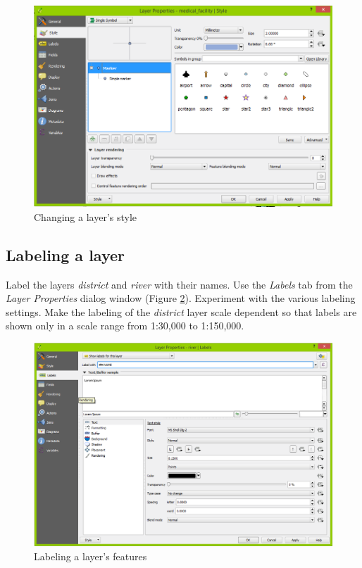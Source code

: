 \documentclass[a4paper,12pt,titlepage]{article}
\begin{document}
\begin{figure}[h]
\centering
\includegraphics[width=12cm]{Images/layer_properties.png}
\caption{Changing a layer's style}\label{fig:layer_properties}
\end{figure}

\subsection{Labeling a layer}

Label the layers \textit{district} and \textit{river} with their names. Use the \textit{Labels} tab from the \textit{Layer Properties} dialog window (Figure \ref{fig:labelling}). Experiment with the various labeling settings. Make the labeling of the \textit{district} layer scale dependent so that labels are shown only in a scale range from 1:30,000 to 1:150,000.

\begin{figure}[h]
\centering
\includegraphics[width=12cm]{Images/labelling.png}
\caption{Labeling a layer's features}\label{fig:labelling}
\end{figure}
\end{document}
